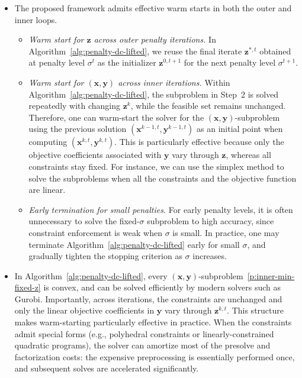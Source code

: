 \documentclass[11pt]{article}
\def\bs{\boldsymbol}
\begin{document}
\begin{itemize}
\item[(iv)]
The proposed framework admits effective warm starts in both the outer and inner loops.
\begin{itemize}
\item[(a)] \emph{Warm start for $\bs{z}$ across outer penalty iterations.}
In Algorithm~\ref{alg:penalty-dc-lifted}, we reuse the final iterate $\bs{z}^{*,t}$ obtained at penalty level $\sigma^t$ as the initializer $\bs{z}^{0,t+1}$ for the next penalty level $\sigma^{t+1}$.

\item[(b)] \emph{Warm start for $(\bs{x},\bs{y})$ across inner iterations.}
Within Algorithm~\ref{alg:penalty-dc-lifted}, the subproblem in Step~2 is solved repeatedly with changing $\bs{z}^k$, while the feasible set remains unchanged.
Therefore, one can warm-start the solver for the $(\bs{x},\bs{y})$-subproblem using the previous solution $(\bs{x}^{k-1, t},\bs{y}^{k-1, t})$ as an initial point when computing $(\bs{x}^{k,t},\bs{y}^{k,t})$.
This is particularly effective because only the objective coefficients associated with $\bs{y}$ vary through $\bs{z}$, whereas all constraints stay fixed. For instance, we can use the simplex method to solve the subproblems when all the constraints and the objective function are linear.

\item[(c)] \emph{Early termination for small penalties.}
For early penalty levels, it is often unnecessary to solve the fixed-$\sigma$ subproblem to high accuracy, since constraint enforcement is weak when $\sigma$ is small. In practice, one may terminate Algorithm~\ref{alg:penalty-dc-lifted} early for small $\sigma$, and gradually tighten the stopping criterion as $\sigma$ increases.
\end{itemize}

\item[(v)] 
In Algorithm~\ref{alg:penalty-dc-lifted}, every $(\bs{x},\bs{y})$-subproblem~\eqref{p:inner-min-fixed-z} is convex, and can be solved efficiently by modern solvers such as Gurobi. Importantly, across iterations, the constraints are unchanged and only the linear objective coefficients in $\bs{y}$ vary through $\bs{z}^{k,t}$. This structure makes warm-starting particularly effective in practice. When the constraints admit special forms (e.g., polyhedral constraints or linearly-constrained quadratic programs), the solver can amortize most of the presolve and factorization costs: the expensive preprocessing is essentially performed once, and subsequent solves are accelerated significantly.
\end{itemize}
\end{document}
